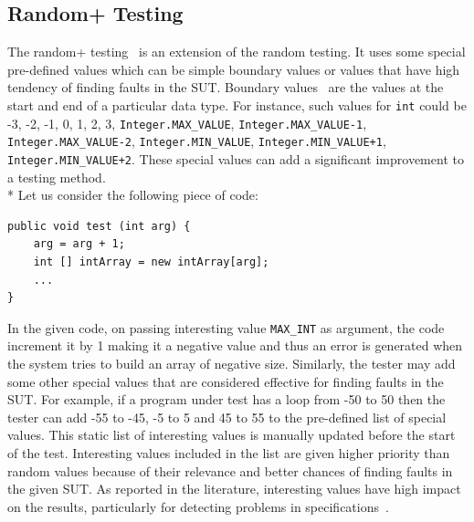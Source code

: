 \subsection{Random+ Testing}
The random+ testing~\cite{leitner2007reconciling} is an extension of the random testing. It uses some special pre-defined values which can be simple boundary values or values that have high tendency of finding faults in the SUT. Boundary values~\cite{beizer2003software} are the values at the start and end of a particular data type. For instance, such values for \verb+int+ could be -3, -2, -1, 0, 1, 2, 3, \verb+Integer.MAX_VALUE+, \verb+Integer.MAX_VALUE-1+, \verb+Integer.MAX_VALUE-2+, \verb+Integer.MIN_VALUE+, \verb-Integer.MIN_VALUE+1-, \verb-Integer.MIN_VALUE+2-. These special values can add a significant improvement to a testing method. \\*
Let us consider the following piece of code:
\bigskip
\bigskip
\begin{lstlisting}
public void test (int arg) {
	arg = arg + 1;
	int [] intArray = new intArray[arg];
	...
}
\end{lstlisting}
\bigskip

In the given code, on passing interesting value \verb+MAX_INT+ as argument, the code increment it by 1 making it a negative value and thus an error is generated when the system tries to build an array of negative size. Similarly, the tester may add some other special values that are considered effective for finding faults in the SUT. For example, if a program under test has a loop from -50 to 50 then the tester can add -55 to -45, -5 to 5 and 45 to 55 to the pre-defined list of special values. This static list of interesting values is manually updated before the start of the test. Interesting values included in the list are given higher priority than random values because of their relevance and better chances of finding faults in the given SUT. As reported in the literature, interesting values have high impact on the results, particularly for detecting problems in specifications~\cite{ciupa2008finding}.


